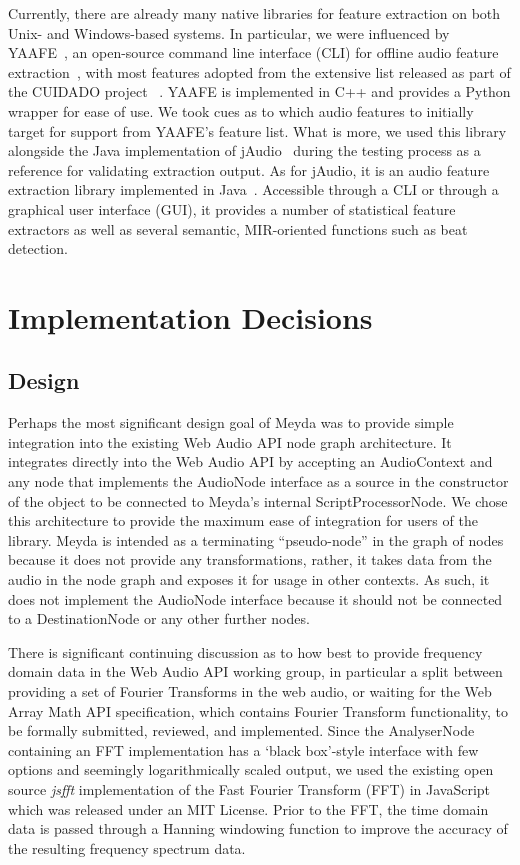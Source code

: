 \documentclass{sig-alternate}
\begin{document}
Currently, there are already many native libraries for feature extraction on both Unix- and Windows-based systems. In particular, we were influenced by YAAFE~\cite{mathieu2010yaafe}, an open-source command line interface (CLI) for offline audio feature extraction~\cite{mathieu2010yaafe}, with most features adopted from the extensive list released as part of the CUIDADO project ~\cite{peeters2004large}. YAAFE is implemented in C++ and provides a Python wrapper for ease of use. We took cues as to which audio features to initially target for support from YAAFE's feature list. What is more, we used this library alongside the Java implementation of jAudio~\cite{mckay2005jaudio} during the testing process as a reference for validating extraction output. As for jAudio, it is an audio feature extraction library implemented in Java~\cite{mckay2005jaudio}. Accessible through a CLI or through a graphical user interface (GUI), it provides a number of statistical feature extractors as well as several semantic, MIR-oriented functions such as beat detection.

\section{Implementation Decisions}
\subsection{Design}
Perhaps the most significant design goal of Meyda was to provide simple integration into the existing Web Audio API node graph architecture. It integrates directly into the Web Audio API by accepting an \mbox{AudioContext}\cite{webaudiospec} and any node that implements the AudioNode interface as a source in the constructor of the object to be connected to Meyda's internal \mbox{ScriptProcessorNode}. We chose this architecture to provide the maximum ease of integration for users of the library. Meyda is intended as a terminating ``pseudo-node'' in the graph of nodes because it does not provide any transformations, rather, it takes data from the audio in the node graph and exposes it for usage in other contexts. As such, it does not implement the \mbox{AudioNode} interface because it should not be connected to a DestinationNode or any other further nodes.

There is significant continuing discussion as to how best to provide frequency domain data in the Web Audio API working group, in particular a split \cite{FFTinWebAudio} between providing a set of Fourier Transforms in the web audio, or waiting for the Web Array Math API\cite{WebArrayMathAPI} specification, which contains Fourier Transform functionality, to be formally submitted, reviewed, and implemented. Since the \mbox{AnalyserNode} containing an FFT implementation has a `black box'-style interface with few options and seemingly logarithmically scaled output, we used the existing open source \emph{jsfft} implementation of the Fast Fourier Transform (FFT) in JavaScript\cite{jsfft} which was released under an MIT License. Prior to the FFT, the time domain data is passed through a Hanning windowing function to improve the accuracy of the resulting frequency spectrum data.
\end{document}
